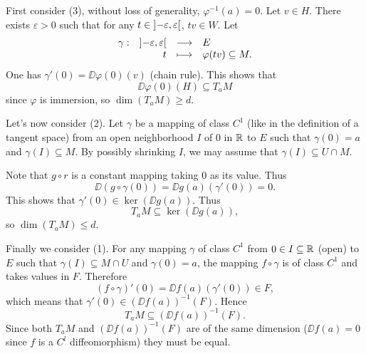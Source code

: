 \begin{proofenv}
    First consider (3), without loss of generality, $\varphi^{-1}(a) = 0$.
    Let $v \in H$. There exists $\varepsilon > 0$ such that for any $t \in \interval[open]{-\varepsilon}{\varepsilon}$, $t v \in W$.
    Let
    $$\begin{array}{rrcl}
        \gamma : & \interval[open]{-\varepsilon}{\varepsilon} & \longrightarrow & E\\
        & t & \longmapsto & \varphi(tv) \subseteq M.
    \end{array}$$
    One has $\gamma'(0) = \DD \varphi(0)(v)$ (chain rule).
    This shows that 
    $$\DD \varphi(0)(H) \subseteq T_aM$$
    since $\varphi$ is immersion, so $\dim (T_a M) \ge d$.

    \quad Let's now consider (2).
    Let $\gamma$ be a mapping of class $C^1$ (like in the definition of a tangent space) from an open neighborhood $I$ of $0$ in $\mathbb{R}$ to $E$ such that $\gamma(0) = a$ and $\gamma(I) \subseteq M$.
    By possibly shrinking $I$, we may assume that $\gamma(I) \subseteq U \cap M$.
    
    \quad Note that $g \circ r$ is a constant mapping taking $0$ as its value.
    Thus
    $$\DD (g \circ \gamma(0)) = \DD g (a) (\gamma'(0)) = 0.$$
    This shows that $\gamma'(0) \in \ker \left(\DD g (a)\right)$.
    Thus
    $$T_aM \subseteq \ker \left(\DD g (a)\right),$$
    so $\dim(T_aM) \le d$.

    \quad Finally we consider (1).
    For any  mapping $\gamma$ of class $C^1$ from $0 \in I \subseteq \mathbb{R}$ (open) to $E$ such that $\gamma(I) \subseteq M \cap U$ and $\gamma(0) = a$,
    the mapping $f \circ \gamma$ is of class $C^1$ and takes values in $F$.
    Therefore
    $$(f \circ \gamma)'(0) = \DD f(a) (\gamma'(0)) \in F,$$
    which means that $\gamma'(0) \in \left(\DD f(a)\right)^{-1} (F)$.
    Hence
    $$T_aM \subseteq \left(\DD f (a)\right)^{-1} (F).$$
    Since both $T_aM$ and $(\DD f (a))^{-1}(F)$ are of the same dimension ($\DD f (a) = 0$ since $f$ is a $C^l$ diffeomorphism) they must be equal.
\end{proofenv}

